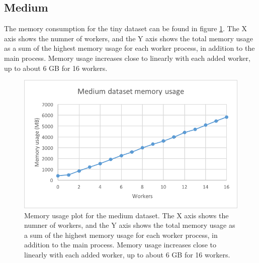\subsection{Medium}
The memory consumption for the tiny dataset can be found in figure \ref{fig:dataset_3_memory}.
The X axis shows the numner of workers, and the Y axis shows the total memory usage as
a sum of the highest memory usage for each worker process, in addition to the main process. Memory usage increases close to linearly with each added worker,
up to about 6 GB for 16 workers.
\begin{figure}[ht]
  \centering
  \includegraphics[width=120mm]{figures/dataset_3/dataset_3_memory.png}
  \caption[Memory usage plot for the medium dataset.]{Memory usage plot for the medium dataset. The X axis shows the numner of workers, and the Y axis shows the total memory usage as
  a sum of the highest memory usage for each worker process, in addition to the main process. Memory usage increases close to linearly with each added worker,
  up to about 6 GB for 16 workers.}
  \label{fig:dataset_3_memory}
\end{figure}

